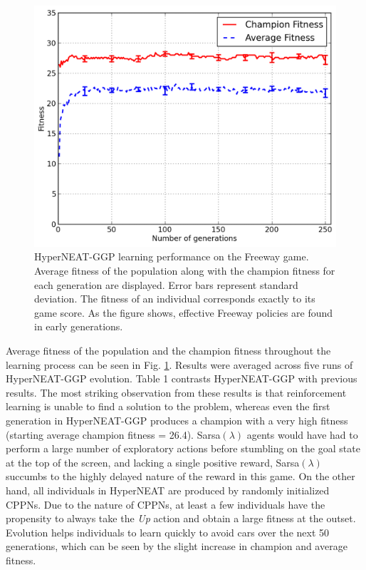 \documentclass{sig-alternate}
\begin{document}
\begin{figure}[ht]
\begin{center}
\includegraphics[width=\columnwidth]{figures/freeway-results}
\end{center}
\caption{HyperNEAT-GGP learning performance on the Freeway game. Average fitness of the population along with the champion fitness for each generation are displayed. Error bars represent standard deviation. The fitness of an individual corresponds exactly to its game score. As the figure shows, effective Freeway policies are found in early generations.}
\label{fig:freeway-curve}
\end{figure}

Average fitness of the population and the champion fitness throughout the learning process can be seen in Fig. \ref{fig:freeway-curve}. Results were averaged across five runs of HyperNEAT-GGP evolution. Table 1 contrasts HyperNEAT-GGP with previous results. The most striking observation from these results is that reinforcement learning is unable to find a solution to the problem, whereas even the first generation in HyperNEAT-GGP produces a champion with a very high fitness (starting average champion fitness = 26.4). Sarsa$(\lambda)$ agents would have had to perform a large number of exploratory actions before stumbling on the goal state at the top of the screen, and lacking a single positive reward, Sarsa$(\lambda)$ succumbs to the highly delayed nature of the reward in this game. On the other hand, all individuals in HyperNEAT are produced by randomly initialized CPPNs. Due to the nature of CPPNs, at least a few individuals have the propensity to always take the \textit{Up} action and obtain a large fitness at the outset. Evolution helps individuals to learn quickly to avoid cars over the next 50 generations, which can be seen by the slight increase in champion and average fitness.
\end{document}
